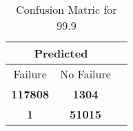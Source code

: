 \begin{table}[] 
\caption{Confusion Matric for 99.9} 
\label{Table: Prediction Accuracy-DMD99.9OnlySunEKF-resetReflectionEKF-top2perfectNoFailurePrediction-Reflection} 
\centering 
\begin{tabular} 
 {@{}ccc@{}} 
\toprule 
\multicolumn{2}{c}{\textbf{Predicted}}
 \\ \midrule 
\multicolumn{1}{|c|}{Failure} & 
\multicolumn{1}{c|}{No Failure}
 \\ \midrule 
\multicolumn{1}{|c|}{\color{green}\textbf{117808}} & 
\multicolumn{1}{c|}{\color{red}\textbf{1304}}
 \\ \midrule 
\multicolumn{1}{|c|}{\color{red}\textbf{1}} & 
\multicolumn{1}{c|}{\color{green}\textbf{51015}}
 \\ \bottomrule 
\end{tabular} 
\end{table} 
